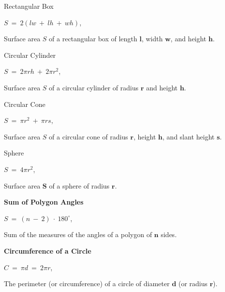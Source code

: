 \documentclass{article}
\begin{document}
\begin{large}
\vspace{0.1in}
\hspace{0.1in} Rectangular Box

\hspace{0.1in} $S\ =\ 2(lw\ +\ lh\ +\ wh)$,\hspace{0.025in} \begin{large}Surface area $S$ of a rectangular box of length $\textbf{l}$, width $\textbf{w}$, and height $\textbf{h}$.\end{large}

\hspace{0.1in} Circular Cylinder

\hspace{0.5in} $S\ =\ 2\pi rh\ +\ 2\pi r^{2}$,\hspace{0.2in} \begin{large}Surface area $S$ of a circular cylinder of radius $\textbf{r}$ and height $\textbf{h}$.\end{large}

\hspace{0.1in} Circular Cone

\hspace{0.2in} $S\ =\ \pi r^{2}\ +\ \pi rs$,\hspace{0.2in} \begin{large}Surface area $S$ of a circular cone of radius $\textbf{r}$, height $\textbf{h}$, and slant height $\textbf{s}$.\end{large}

\hspace{0.1in} Sphere

\hspace{1.5in} $S\ =\ 4\pi r^{2}$,\hspace{0.2in} \begin{large}Surface area $\textbf{S}$ of a sphere of radius $\textbf{r}$.\end{large}

\textbf{Sum of Polygon Angles}

\hspace{0.2in} $S\ =\ (n\ -\ 2)\ \cdot\ 180^{\circ}$,\hspace{0.2in} \begin{large}Sum of the measures of the angles of a polygon of $\textbf{n}$ sides.\end{large}

\textbf{Circumference of a Circle}

\hspace{0.1in} $C\ =\ \pi d\ =\ 2\pi r$,\hspace{0.2in} \begin{large}The perimeter (or circumference) of a circle of diameter $\textbf{d}$ (or radius $\textbf{r}$).\end{large}


\end{large}
\end{document}
